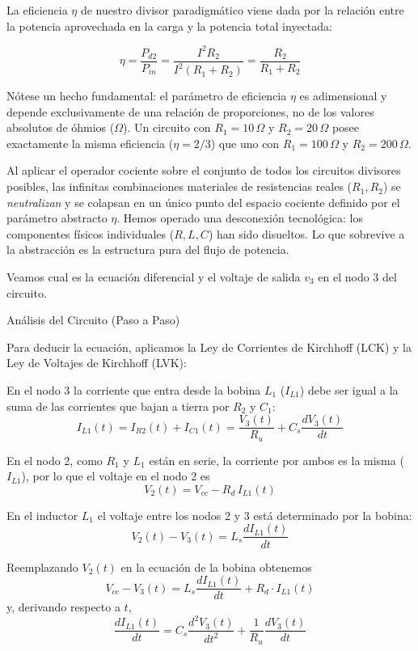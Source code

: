 \documentclass[11pt, a4paper]{article}
\theoremstyle{definition}
\theoremstyle{plain}
\theoremstyle{plain}
\theoremstyle{remark}
\theoremstyle{remark}
\theoremstyle{remark}
\begin{document}
La eficiencia $\eta$ de nuestro divisor paradigmático viene dada por la relación entre la potencia aprovechada en la carga y la potencia total inyectada:

\begin{equation}
	\eta = \frac{P_{d2}}{P_{in}} = \frac{I^2 R_2}{I^2 (R_1 + R_2)} = \frac{R_2}{R_1 + R_2}
\end{equation}

Nótese un hecho fundamental: el parámetro de eficiencia $\eta$ es adimensional y depende exclusivamente de una relación de proporciones, no de los valores absolutos de óhmios ($\Omega$). Un circuito con $R_1 = 10\,\Omega$ y $R_2 = 20\,\Omega$ posee exactamente la misma eficiencia ($\eta = 2/3$) que uno con $R_1 = 100\,\Omega$ y $R_2 = 200\,\Omega$. 

Al aplicar el operador cociente sobre el conjunto de todos los circuitos divisores posibles, las infinitas combinaciones materiales de resistencias reales ($R_1, R_2$) se \textit{neutralizan} y se colapsan en un único punto del espacio cociente definido por el parámetro abstracto $\eta$. Hemos operado una desconexión tecnológica: los componentes físicos individuales ($R, L, C$) han sido disueltos. Lo que sobrevive a la abstracción es la estructura pura del flujo de potencia.



Veamos cual es la ecuación diferencial y el voltaje de salida $v_3$ en el nodo 3 del circuito.


Análisis del Circuito (Paso a Paso)

Para deducir la ecuación, aplicamos la Ley de Corrientes de Kirchhoff (LCK) y la Ley de Voltajes de Kirchhoff (LVK):

En el nodo 3 la corriente que entra desde la bobina $L_1$ ($I_{L1}$) debe ser igual a la suma de las corrientes que bajan a tierra por $R_2$ y $C_1$:
\begin{equation}
	I_{L1}(t) = I_{R2}(t) + I_{C1}(t) = \frac{V_3(t)}{R_u} + C_s \frac{dV_3(t)}{dt}	
	\label{eq:il1}
\end{equation}

En el nodo 2, como $R_1$ y $L_1$ están en serie, la corriente por ambos es la misma ($I_{L1}$), por lo que el voltaje en el nodo 2 es
$$V_2(t) = V_{cc} - R_d \, I_{L1}(t)$$ 

En el inductor $L_1$ el voltaje entre los nodos 2 y 3 está determinado por la bobina:
$$V_2(t) - V_3(t) = L_s \frac{dI_{L1}(t)}{dt}$$ 

Reemplazando $V_2(t)$ en la ecuación de la bobina obtenemos
$$V_{cc} - V_3(t) = L_s \frac{dI_{L1}(t)}{dt} + R_d \cdot I_{L1}(t)$$ 
y, derivando respecto a $t$,
$$\frac{dI_{L1}(t)}{dt} = C_s \frac{d^2V_3(t)}{dt^2} + \frac{1}{R_u} \frac{dV_3(t)}{dt}$$ 
\end{document}
